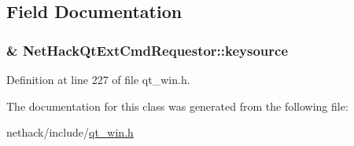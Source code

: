 \subsection{Field Documentation}
\hypertarget{classNetHackQtExtCmdRequestor_afb1ec408c71ea57a1b65315a32816258}{
\subsubsection[{keysource}]{\& Net\+Hack\+Qt\+Ext\+Cmd\+Requestor\+::keysource\hspace{0.3cm}{\ttfamily [private]}}}\label{classNetHackQtExtCmdRequestor_afb1ec408c71ea57a1b65315a32816258}


Definition at line 227 of file qt\+\_\+win.\+h.



The documentation for this class was generated from the following file\+:\begin{DoxyCompactItemize}
\item 
nethack/include/\hyperlink{qt__win_8h}{qt\+\_\+win.\+h}\end{DoxyCompactItemize}
